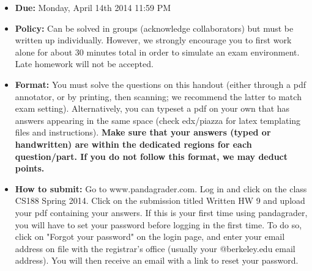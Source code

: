 \begin{itemize}
\item \textbf{Due:} Monday, April 14th 2014 11:59 PM
\item \textbf{Policy:} Can be solved in groups (acknowledge collaborators) but must
be written up individually. However,
we strongly encourage you to first work alone for about 30 minutes total in order to simulate an exam environment.  Late homework
will not be accepted.
\item \textbf{Format:}
You must solve the questions on this handout (either through a pdf annotator, or by printing, then scanning; we recommend the latter to match exam setting). Alternatively, you can typeset a pdf on your own that has answers appearing in the same space (check edx/piazza for latex templating files and instructions).
\textbf{Make sure that your answers (typed or handwritten) are within the
dedicated regions for each question/part.  If you do not follow this format, we may deduct points.}

\item \textbf{How to submit:}  Go to www.pandagrader.com. Log in and click on the
class CS188 Spring 2014. Click
on the submission titled Written HW 9 and upload your pdf containing your answers. If this is your first time using
pandagrader, you will have to set your password before logging in the
first time.  To do so, click on "Forgot your password" on the login
page, and enter your email address on file with the registrar's office
(usually your @berkeley.edu email address). You will then receive an
email with a link to reset your password.

\end{itemize}



